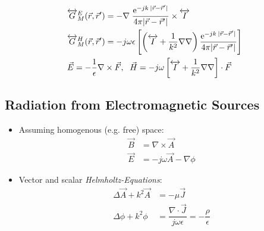 \begin{itemize}
\begin{align*}
            &\overleftrightarrow{G}^E_M(\vec{r},\vec{r}^\prime) = -\nabla\;\dfrac{\mathrm{e}^{-jk\:|\vec{r} - \vec{r}^\prime|}}{4\pi|\vec{r} - \vec{r}^\prime|} \times \overleftrightarrow{I}\\
            &\overleftrightarrow{G}^H_M(\vec{r},\vec{r}^\prime) = -j\omega\epsilon\left[\left(\overleftrightarrow{I} + \dfrac{1}{k^2}\nabla\nabla\right) \dfrac{\mathrm{e}^{-jk\:|\vec{r} - \vec{r}^\prime|}}{4\pi|\vec{r} - \vec{r}^\prime|}\right]\\
            &\vec{E} = -\dfrac{1}{\epsilon} \nabla \times \vec{F},\;\
            \vec{H} = -j\omega \left[\overleftrightarrow{I} + \dfrac{1}{k^2}\nabla\nabla\right] \cdot \vec{F}
        \end{align*}
\end{itemize}

\subsection{Radiation from Electromagnetic Sources}
\begin{itemize}
    \itemsep0pt
    \item Assuming homogenous (e.g. free) space:
        \begin{align*}
            \vec{B} &= \nabla\times\vec{A}\\
            \vec{E} &= -j\omega\vec{A} - \nabla\phi
        \end{align*}
    \item Vector and scalar \textit{Helmholtz-Equations}:
        \begin{align*}
            \Delta \vec{A} + k^2 \vec{A} &= -\mu \vec{J}\\
            \Delta \phi + k^2 \phi &= \dfrac{\nabla\cdot\vec{J}}{j\omega\epsilon} = -\dfrac{\rho}{\epsilon}
        \end{align*}
\end{itemize}

